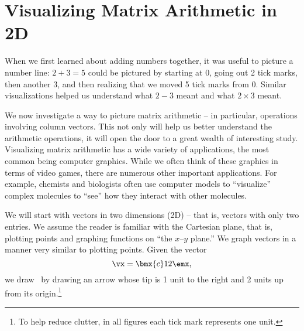 \section{Visualizing Matrix Arithmetic in 2D}\label{sec:geom_1}




When we first learned about adding numbers together, it was useful to picture a number line: $2+3=5$ could be pictured by starting at 0, going out 2 tick marks, then another 3, and then realizing that we moved 5 tick marks from 0. Similar visualizations helped us understand what $2-3$ meant and what $2\times 3$ meant.


We now investigate a way to picture matrix arithmetic -- in particular, operations involving column vectors. This not only will help us better understand the arithmetic operations, it will open the door to a great wealth of interesting study. Visualizing matrix arithmetic has a wide variety of applications, the most common being computer graphics. While we often think of these graphics in terms of video games, there are numerous other important applications. For example, chemists and biologists often use computer models to ``visualize'' complex molecules to ``see'' how they interact with other molecules.%


We will start with vectors in two dimensions (2D) -- that is, vectors with only two entries. We assume the reader is familiar with the Cartesian plane, that is, plotting points and graphing functions on ``the $x$--$y$ plane.'' We graph vectors in a manner very similar to plotting points. Given the vector 
\[
\vx = \bmx{c}1\\2\emx,
\]
we draw \vx\ by drawing an arrow whose tip is 1 unit to the right and 2 units up from its origin.\footnote{To help reduce clutter, in all figures each tick mark represents one unit.} 

